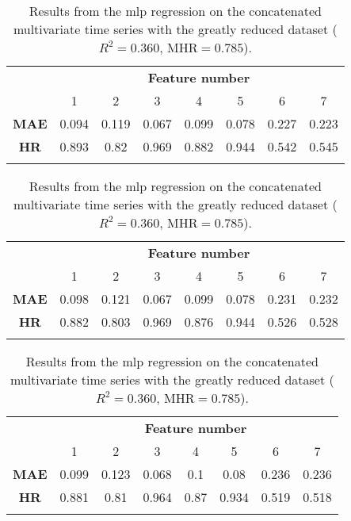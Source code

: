 \begin{table}
    \begin{center}
        \caption{\label{tab:mlpreg:mts_comp} Results from the \ac{mlp} regression on the concatenated multivariate time series with the complete dataset (\(R^2 = 0.301\), \(\text{MHR} = 0.799\)).}
        \begin{tabular}{ >{\bfseries}c c c c c c c c }
            \multirow{2}{*}{\textbf{Measure}} & \multicolumn{7}{c}{\textbf{Feature number}} \\
            & 1 & 2 & 3 & 4 & 5 & 6 & 7 \\
            \midrule
            MAE & 0.094 & 0.119 & 0.067 & 0.099 & 0.078 & 0.227 & 0.223 \\
            HR  & 0.893 & 0.82 & 0.969 & 0.882 & 0.944 & 0.542 & 0.545 \\
            \\
        \end{tabular}

        \caption{\label{tab:mlpreg:mts_red} Results from the \ac{mlp} regression on the concatenated multivariate time series with the reduced dataset (\(R^2 = 0.357\), \(\text{MHR} = 0.790\)).}
        \begin{tabular}{ >{\bfseries}c c c c c c c c }
            \multirow{2}{*}{\textbf{Measure}} & \multicolumn{7}{c}{\textbf{Feature number}} \\
            & 1 & 2 & 3 & 4 & 5 & 6 & 7 \\
            \midrule
            MAE & 0.098 & 0.121 & 0.067 & 0.099 & 0.078 & 0.231 & 0.232 \\
            HR  & 0.882 & 0.803 & 0.969 & 0.876 & 0.944 & 0.526 & 0.528 \\
            \\
        \end{tabular}

        \caption{\label{tab:mlpreg:mts_vred} Results from the \ac{mlp} regression on the concatenated multivariate time series with the greatly reduced dataset (\(R^2 = 0.360\), \(\text{MHR} = 0.785\)).}
        \begin{tabular}{ >{\bfseries}c c c c c c c c }
            \multirow{2}{*}{\textbf{Measure}} & \multicolumn{7}{c}{\textbf{Feature number}} \\
            & 1 & 2 & 3 & 4 & 5 & 6 & 7 \\
            \midrule
            MAE & 0.099 & 0.123 & 0.068 & 0.1 & 0.08 & 0.236 & 0.236 \\
            HR  & 0.881 & 0.81 & 0.964 & 0.87 & 0.934 & 0.519 & 0.518 \\
            \\
        \end{tabular}
    \end{center}
\end{table}

